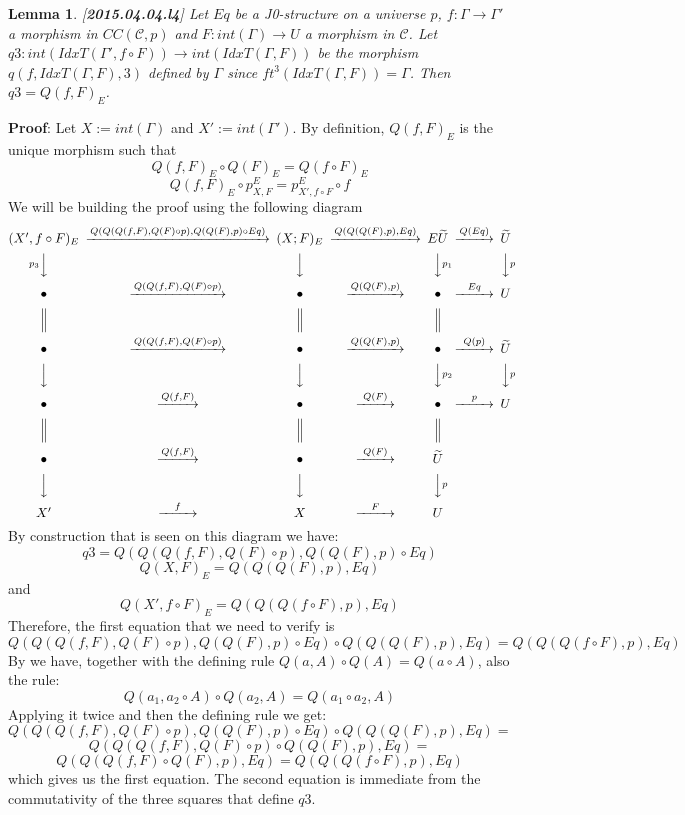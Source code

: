 \documentclass[12pt]{article}
\newenvironment{myproof}{{\bf Proof}:}{\vskip 5mm }
\newtheorem{lemma}[proposition]{Lemma}
\newcommand{\llabel}[1]{\label{#1}[{\bf #1}]}
\newcommand{\sr}{\rightarrow}
\newcommand{\wt}{\widetilde}
\newcommand{\BB}{{\bullet}}
\begin{document}
\begin{lemma}
\llabel{2015.04.04.l4}
Let $Eq$ be a J0-structure on a universe $p$, $f:\Gamma\sr \Gamma'$ a morphism in $CC({\mathcal C},p)$ and $F:int(\Gamma)\sr U$ a morphism in $\mathcal C$.  Let $q3:int(IdxT(\Gamma',f\circ F))\sr int(IdxT(\Gamma,F))$ be the morphism $q(f,IdxT(\Gamma,F),3)$ defined by $\Gamma$ since $ft^3(IdxT(\Gamma,F))=\Gamma$. Then $q3=Q(f,F)_{E}$.
\end{lemma}
%
\begin{myproof}
Let $X:=int(\Gamma)$ and $X':=int(\Gamma')$. By definition, $Q(f,F)_{E}$ is the  unique morphism such that
%
$$Q(f,F)_{E}\circ Q(F)_{E}=Q(f\circ F)_{E}$$
$$Q(f,F)_{E}\circ p^{E}_{X,F}=p^{E}_{X',f\circ F}\circ f$$
%
We will be building the proof using the following diagram
%
$$
\begin{CD}
(X',f\circ F)_{E} @>Q(Q(Q(f,F),Q(F)\circ p),Q(Q(F),p)\circ Eq)>> (X;F)_{E} @>Q(Q(Q(F),p),Eq)>> E\wt{U} @>Q(Eq)>> \wt{U}\\
@Vp_3VV @VVV @VVp_1V @VVp V\\
\BB @>Q(Q(f,F),Q(F)\circ p)>> \BB @>Q(Q(F),p)>> \BB @>Eq>>U\\
@| @| @|\\
\BB @>Q(Q(f,F),Q(F)\circ p)>> \BB @>Q(Q(F),p)>> \BB @>Q(p)>> \wt{U}\\
@VVV @VVV @VVp_2V @VVp V\\
\BB @>Q(f,F)>> \BB @>Q(F)>> \BB @>p>> U\\
@| @| @|\\
\BB @>Q(f,F)>> \BB @>Q(F)>> \wt{U}\\
@VVV @VVV @VVp V\\
X' @>f>> X @>F>> U
\end{CD}
$$
%
By construction that is seen on this diagram we have:
%
$$q3=Q(Q(Q(f,F),Q(F)\circ p),Q(Q(F),p)\circ Eq)$$
$$Q(X,F)_{E}=Q(Q(Q(F),p),Eq)$$
%
and
%
$$Q(X', f\circ F)_{E}=Q(Q(Q(f\circ F),p),Eq)$$
%
Therefore, the first equation that we need to verify is
%
$$Q(Q(Q(f,F),Q(F)\circ p),Q(Q(F),p)\circ Eq)\circ Q(Q(Q(F),p),Eq)=Q(Q(Q(f\circ F),p),Eq)$$
%
By \cite[Lemma 3.2]{fromunivwithPi} we have, together with the defining rule $Q(a,A)\circ Q(A)=Q(a\circ A)$, also the rule:
%
$$Q(a_1,a_2\circ A)\circ Q(a_2,A)=Q(a_1\circ a_2, A)$$
%
Applying it twice and then the defining rule we get:
%
$$Q(Q(Q(f,F),Q(F)\circ p),Q(Q(F),p)\circ Eq)\circ Q(Q(Q(F),p),Eq)=$$
$$Q(Q(Q(f,F),Q(F)\circ p)\circ Q(Q(F),p), Eq)=$$
$$Q(Q(Q(f,F)\circ Q(F),p),Eq)=Q(Q(Q(f\circ F),p),Eq)$$
%
which gives us the first equation. The second equation is immediate from the commutativity of the three squares that define $q3$. 
\end{myproof}
\end{document}
